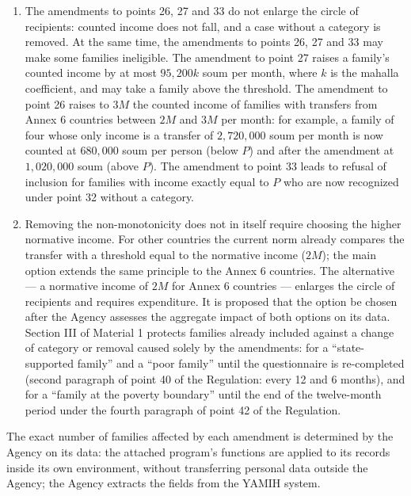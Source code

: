 \documentclass[14pt,a4paper]{extarticle}
\begin{document}
\begin{enumerate}[leftmargin=1.27cm]
\item The amendments to points 26, 27 and 33 do not enlarge the circle of recipients: counted income does not fall, and a case without a category is removed. At the same time, the amendments to points 26, 27 and 33 may make some families ineligible. The amendment to point 27 raises a family’s counted income by at most $95{,}200k$ soum per month, where $k$ is the mahalla coefficient, and may take a family above the threshold. The amendment to point 26 raises to $3M$ the counted income of families with transfers from Annex 6 countries between $2M$ and $3M$ per month: for example, a family of four whose only income is a transfer of $2{,}720{,}000$ soum per month is now counted at $680{,}000$ soum per person (below $P$) and after the amendment at $1{,}020{,}000$ soum (above $P$). The amendment to point 33 leads to refusal of inclusion for families with income exactly equal to $P$ who are now recognized under point 32 without a category.
\item Removing the non-monotonicity does not in itself require choosing the higher normative income. For other countries the current norm already compares the transfer with a threshold equal to the normative income ($2M$); the main option extends the same principle to the Annex 6 countries. The alternative — a normative income of $2M$ for Annex 6 countries — enlarges the circle of recipients and requires expenditure. It is proposed that the option be chosen after the Agency assesses the aggregate impact of both options on its data. Section III of Material 1 protects families already included against a change of category or removal caused solely by the amendments: for a “state-supported family” and a “poor family” until the questionnaire is re-completed (second paragraph of point 40 of the Regulation: every 12 and 6 months), and for a “family at the poverty boundary” until the end of the twelve-month period under the fourth paragraph of point 42 of the Regulation.
\end{enumerate}
The exact number of families affected by each amendment is determined by the Agency on its data: the attached program’s functions are applied to its records inside its own environment, without transferring personal data outside the Agency; the Agency extracts the fields from the YAMIH system.
\end{document}
